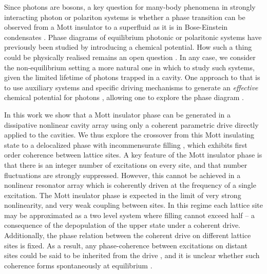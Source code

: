 Since photons are bosons, a key question for many-body phenomena in strongly interacting photon or polariton systems is whether a phase transition can be observed from a Mott insulator to a superfluid \cite{Hartmann2007} as it is in Bose-Einstein condensates \cite{Fisher1989,Jaksch1998,Greiner2002}. Phase diagrams of equilibrium photonic or polaritonic systems have previously been studied by introducing a chemical potential. How such a thing could be physically realised remains an open question \cite{Hartmann2016,Greentree2006,Koch2009,DeLeeuw2015}. In any case, we consider the non-equilibrium setting a more natural one in which to study such systems, given the limited lifetime of photons trapped in a cavity. One approach to that is to use auxiliary systems and specific driving mechanisms to generate an \emph{effective} chemical potential for photons \cite{Marcos2012, Hafezi2015,Ma2017,Lebreuilly2017}, allowing one to explore the phase diagram \cite{Biella2017}.

In this work we show that a Mott insulator phase can be generated in a dissipative nonlinear cavity array using only a coherent parametric drive directly applied to the cavities. We thus explore the crossover from this Mott insulating state to a delocalized phase with incommensurate filling \cite{LeBoite2013,Hartmann2010,Jin2013,Abbarchi2013,Raftery2014,Altman2015,Dagvadorj2015}, which exhibits first order coherence between lattice sites. A key feature of the Mott insulator phase is that there is an integer number of excitations on every site, and that number fluctuations are strongly suppressed. However, this cannot be achieved in a nonlinear resonator array which is coherently driven at the frequency of a single excitation. The Mott insulator phase is expected in the limit of very strong nonlinearity, and very weak coupling between sites. In this regime each lattice site may be approximated as a two level system where filling cannot exceed half -- a consequence of the depopulation of the upper state under a coherent drive. Additionally, the phase relation between the coherent drive on different lattice sites is fixed. As a result, any phase-coherence between excitations on distant sites could be said to be inherited from the drive \cite{Ruiz-Rivas2014}, and it is unclear whether such coherence forms spontaneously at equilibrium \cite{Fisher1989,Jaksch1998,Greiner2002}.

